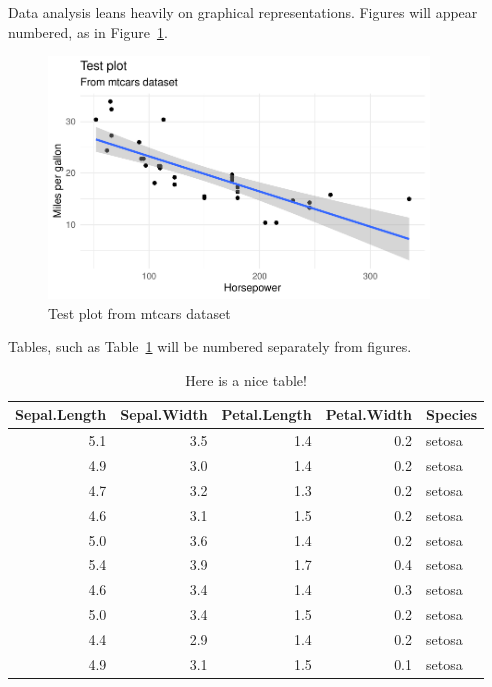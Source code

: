 \documentclass[
  letterpaper,
]{latex/krantz}
\begin{document}
Data analysis leans heavily on graphical representations. Figures will
appear numbered, as in Figure~\ref{fig-test-fig}.

\begin{figure}

{\centering \includegraphics[width=0.9\textwidth,height=\textheight]{./preface_files/figure-pdf/fig-test-fig-1.pdf}

}

\caption{\label{fig-test-fig}Test plot from mtcars dataset}

\end{figure}

Tables, such as Table~\ref{tbl-test-table} will be numbered separately
from figures.

\hypertarget{tbl-test-table}{}
\begin{table}
\caption{\label{tbl-test-table}Here is a nice table! }\tabularnewline

\centering
\begin{tabular}{r|r|r|r|l}
\hline
Sepal.Length & Sepal.Width & Petal.Length & Petal.Width & Species\\
\hline
5.1 & 3.5 & 1.4 & 0.2 & setosa\\
\hline
4.9 & 3.0 & 1.4 & 0.2 & setosa\\
\hline
4.7 & 3.2 & 1.3 & 0.2 & setosa\\
\hline
4.6 & 3.1 & 1.5 & 0.2 & setosa\\
\hline
5.0 & 3.6 & 1.4 & 0.2 & setosa\\
\hline
5.4 & 3.9 & 1.7 & 0.4 & setosa\\
\hline
4.6 & 3.4 & 1.4 & 0.3 & setosa\\
\hline
5.0 & 3.4 & 1.5 & 0.2 & setosa\\
\hline
4.4 & 2.9 & 1.4 & 0.2 & setosa\\
\hline
4.9 & 3.1 & 1.5 & 0.1 & setosa\\
\hline
\end{tabular}
\end{table}
\end{document}
